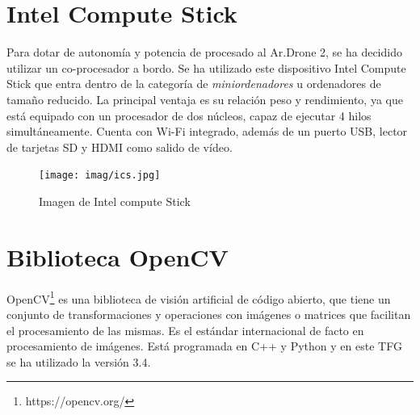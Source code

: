 {%
	
	
	
	
	\section{Intel Compute Stick}
	\label{sec:ics}
	
	Para dotar de autonomía y potencia de procesado al Ar.Drone 2, se ha decidido utilizar un co-procesador a bordo. Se ha utilizado este dispositivo Intel Compute Stick que entra dentro de la categoría de \textit{miniordenadores} u ordenadores de tamaño reducido. La principal ventaja es su relación peso y rendimiento, ya que está equipado con un procesador de dos núcleos, capaz de ejecutar 4 hilos simultáneamente. Cuenta con Wi-Fi integrado, además de un puerto USB, lector de tarjetas SD y HDMI como salido de vídeo.
	
	\begin{figure}[H]
		\centering
		\texttt{[image: imag/ics.jpg]}
		\caption{Imagen de Intel compute Stick}
		\label{FIG:34_ics}
	\end{figure}
	
	\section{Biblioteca OpenCV} \label{sec:opencvs}
	
	OpenCV\footnote{https://opencv.org/} es una biblioteca de visión artificial de código abierto, que tiene un conjunto de transformaciones y operaciones con imágenes o matrices que facilitan el procesamiento de las mismas. Es el estándar internacional de facto en procesamiento de imágenes. Está programada en C++ y Python y en este TFG se ha utilizado la versión 3.4.
	
}
